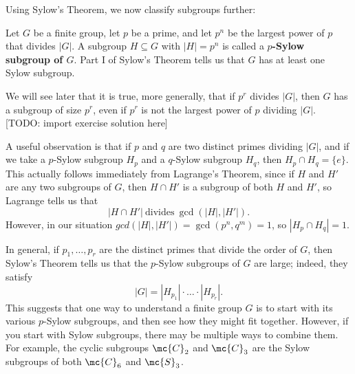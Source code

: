 \documentclass[math1530-lecture-notes]{subfiles}
\begin{document}
Using Sylow's Theorem, we now classify subgroups further:
\begin{definition}{}
  Let $G$ be a finite group, let $p$ be a prime, and let $p^n$ be the largest power of $p$ that
  divides $\left| G \right| $. A subgroup $H\subseteq G$ with $\left| H \right| =p^n$ is called a
  \textbf{$p$-Sylow subgroup of $G$}. Part I of Sylow's Theorem tells us that $G$ has at least one
  Sylow subgroup.
\end{definition}
\begin{remark}
  We will see later that it is true, more generally, that if $p^r$ divides $\left| G \right| $, then
  $G$ has a subgroup of size $p^r$, even if $p^r$ is not the largest power of $p$ dividing $\left| G
  \right| $. [TODO: import exercise solution here]
\end{remark}
\begin{remark}
  A useful observation is that if $p$ and $q$ are two distinct primes dividing $\left| G \right| $,
  and if we take a $p$-Sylow subgroup $H_p$ and a $q$-Sylow subgroup $H_q$, then $H_p\cap H_q=\{ e
  \}$. This actually follows immediately from Lagrange's Theorem, since if $H$ and $H'$ are any two
  subgroups of $G$, then $H\cap H'$ is a subgroup of both $H$ and $H'$, so Lagrange tells us that \[
    \left| H\cap H' \right| ~\text{divides}~ \gcd{(\left| H \right| ,\left| H' \right| )}
  .\] However, in our situation $gcd(\left| H \right|,\left| H' \right| )=\gcd{(p^n,q^m)}=1$, so
  $\left| H_p\cap H_q \right| =1$.
\end{remark}

\begin{remark}
  In general, if $p_1,\ldots,p_r$ are the distinct primes that divide the order of $G$, then Sylow's
  Theorem tells us that the $p$-Sylow subgroups of $G$ are large; indeed, they satisfy \[
    \left| G \right|=\left| H_{p_1} \right|  \cdot \ldots\cdot \left| H_{p_r} \right| 
  .\] This suggests that one way to understand a finite group $G$ is to start with its various
  $p$-Sylow subgroups, and then see how they might fit together. However, if you start with Sylow
  subgroups, there may be multiple ways to combine them. For example, the cyclic subgroups
  $\mc{C}_2$ and $\mc{C}_3$ are the Sylow subgroups of both $\mc{C}_6$ and $\mc{S}_3$.
\end{remark}
\end{document}
